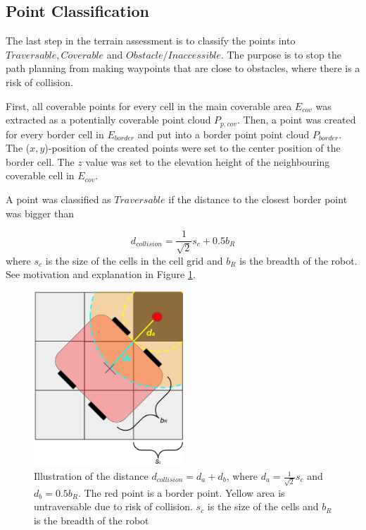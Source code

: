 \subsection{Point Classification}
The last step in the terrain assessment is to classify the points into $Traversable, Coverable$ and $Obstacle/Inaccessible$. The purpose is to stop the path planning from making waypoints that are close to obstacles, where there is a risk of collision. 

First, all coverable points for every cell in the main coverable area $E_{cov}$ was extracted as a potentially coverable point cloud $P_{p, cov}$. Then, a point was created for every border cell in $E_{border}$ and put into a border point point cloud $P_{border}$. The ($x,y$)-position of the created points were set to the center position of the border cell. The $z$ value was set to the elevation height of the neighbouring coverable cell in $E_{cov}$. 

A point was classified as $Traversable$ if the distance to the closest border point was bigger than

$$
d_{collision} = \frac{1}{\sqrt{2}} s_c + 0.5  b_R
$$
where $s_c$ is the size of the cells in the cell grid and $b_R$ is the breadth of the robot. See motivation and explanation in Figure \ref{fig:dcollision}.

\begin{figure}
    \centering
    \includegraphics[width=0.5\textwidth]{figures/dcollision.png}
    \caption{Illustration of the distance $d_{collision} = d_a + d_b$, where $d_a =  \frac{1}{\sqrt{2}} s_c$ and $d_b = 0.5 b_R$. The red point is a border point. Yellow area is untraversable due to risk of collision. $s_c$ is the size of the cells and $b_R$ is the breadth of the robot}
    \label{fig:dcollision}
\end{figure}

